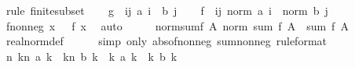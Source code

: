 \begin{isabellebody}
\ {\isacharparenleft}{\kern0pt}rule\ finite{\isacharunderscore}{\kern0pt}subset{\isacharparenright}{\kern0pt}\isanewline
\isanewline
\ \ \isamarkupfalse%
\ {\isacharquery}{\kern0pt}g\ {\isacharequal}{\kern0pt}\ {\isachardoublequoteopen}{\isasymlambda}{\isacharparenleft}{\kern0pt}i{\isacharcomma}{\kern0pt}j{\isacharparenright}{\kern0pt}{\isachardot}{\kern0pt}\ a\ i\ {\isacharasterisk}{\kern0pt}\ b\ j{\isachardoublequoteclose}\isanewline
\ \ \isamarkupfalse%
\ {\isacharquery}{\kern0pt}f\ {\isacharequal}{\kern0pt}\ {\isachardoublequoteopen}{\isasymlambda}{\isacharparenleft}{\kern0pt}i{\isacharcomma}{\kern0pt}j{\isacharparenright}{\kern0pt}{\isachardot}{\kern0pt}\ norm\ {\isacharparenleft}{\kern0pt}a\ i{\isacharparenright}{\kern0pt}\ {\isacharasterisk}{\kern0pt}\ norm\ {\isacharparenleft}{\kern0pt}b\ j{\isacharparenright}{\kern0pt}{\isachardoublequoteclose}\isanewline
\ \ \isamarkupfalse%
\ f{\isacharunderscore}{\kern0pt}nonneg{\isacharcolon}{\kern0pt}\ {\isachardoublequoteopen}{\isasymAnd}x{\isachardot}{\kern0pt}\ {}\ {\isasymle}\ {\isacharquery}{\kern0pt}f\ x{\isachardoublequoteclose}\ \isamarkupfalse%
\ auto\isanewline
\ \ \isamarkupfalse%
\ \isamarkupfalse%
\ norm{\isacharunderscore}{\kern0pt}sum{\isacharunderscore}{\kern0pt}f{\isacharcolon}{\kern0pt}\ {\isachardoublequoteopen}{\isasymAnd}A{\isachardot}{\kern0pt}\ norm\ {\isacharparenleft}{\kern0pt}sum\ {\isacharquery}{\kern0pt}f\ A{\isacharparenright}{\kern0pt}\ {\isacharequal}{\kern0pt}\ sum\ {\isacharquery}{\kern0pt}f\ A{\isachardoublequoteclose}\isanewline
\ \ \ \ \isamarkupfalse%
\ real{\isacharunderscore}{\kern0pt}norm{\isacharunderscore}{\kern0pt}def\isanewline
\ \ \ \ \isamarkupfalse%
\ {\isacharparenleft}{\kern0pt}simp\ only{\isacharcolon}{\kern0pt}\ abs{\isacharunderscore}{\kern0pt}of{\isacharunderscore}{\kern0pt}nonneg\ sum{\isacharunderscore}{\kern0pt}nonneg\ {\isacharbrackleft}{\kern0pt}rule{\isacharunderscore}{\kern0pt}format{\isacharbrackright}{\kern0pt}{\isacharparenright}{\kern0pt}\isanewline
\isanewline
\ \ \isamarkupfalse%
\ {\isachardoublequoteopen}{\isacharparenleft}{\kern0pt}{\isasymlambda}n{\isachardot}{\kern0pt}\ {\isacharparenleft}{\kern0pt}{\isasymSum}k{\isacharless}{\kern0pt}n{\isachardot}{\kern0pt}\ a\ k{\isacharparenright}{\kern0pt}\ {\isacharasterisk}{\kern0pt}\ {\isacharparenleft}{\kern0pt}{\isasymSum}k{\isacharless}{\kern0pt}n{\isachardot}{\kern0pt}\ b\ k{\isacharparenright}{\kern0pt}{\isacharparenright}{\kern0pt}\ {\isasymlonglonglongrightarrow}\ {\isacharparenleft}{\kern0pt}{\isasymSum}k{\isachardot}{\kern0pt}\ a\ k{\isacharparenright}{\kern0pt}\ {\isacharasterisk}{\kern0pt}\ {\isacharparenleft}{\kern0pt}{\isasymSum}k{\isachardot}{\kern0pt}\ b\ k{\isacharparenright}{\kern0pt}{\isachardoublequoteclose}\isanewline

\end{isabellebody}
